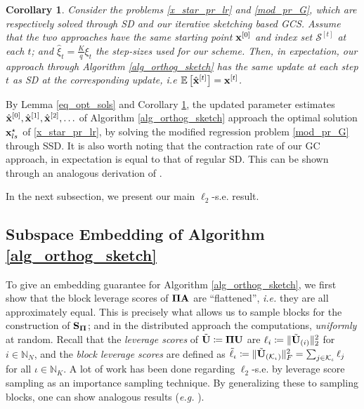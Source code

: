 \documentclass[journal,letterpaper,onecolumn,twoside,nofonttune]{IEEEtran}
\newcommand{\K}{\mathcal{K}}
\newcommand{\Ub}{\bold{U}}
\newcommand{\xb}{\bold{x}}
\newcommand{\xbh}{{\hat{\bold{x}}}}
\newcommand{\xih}{\hat{\xi}}
\newcommand{\Pibold}{\bold{\Pi}}
\newcommand{\Scal}{\mathcal{S}}
\newcommand{\E}{\mathbb{E}}
\newcommand{\N}{\mathbb{N}}
\newcommand{\Sb}{\bold{S}}
\newcommand{\SbPi}{\Sb_{\Pibold}}
\newcommand{\Ab}{\bold{A}}
\newcommand{\Ubt}{\tilde{\bold{U}}}
\newtheorem{Cor}{Corollary}
\begin{document}
\begin{Cor}
\label{eq_SSD_dor}  %
Consider the problems \eqref{x_star_pr_lr} and \eqref{mod_pr_G}, which are respectively solved through SD and our iterative sketching based GCS. Assume that the two approaches have the same starting point $\xb^{[0]}$ and index set $\Scal^{[t]}$ at each $t$; and $\xih_t=\frac{K}{q}\xi_t$ the step-sizes used for our scheme. Then, in expectation, our approach through Algorithm \ref{alg_orthog_sketch} has the same update at each step $t$ as SD at the corresponding update, i.e $\E\left[\xbh^{[t]}\right]=\xb^{[t]}$.
\end{Cor}

By Lemma \ref{eq_opt_sols} and Corollary \ref{eq_SSD_dor}, the updated parameter estimates $\xbh^{[0]},\xbh^{[1]},\xbh^{[2]},\ldots$ of Algorithm \ref{alg_orthog_sketch} approach the optimal solution $\xb_{ls}^{\star}$ of \eqref{x_star_pr_lr}, by solving the modified regression problem \eqref{mod_pr_G} through SSD. It is also worth noting that the contraction rate of our GC approach, in expectation is equal to that of regular SD. This can be shown through an analogous derivation of \cite[Theorem 6]{CPH23b}.%

In the next subsection, we present our main $\ell_2$-s.e. result.

\subsection{Subspace Embedding of Algorithm \ref{alg_orthog_sketch}}
\label{subsp_emb_alg1}

To give an embedding guarantee for Algorithm \ref{alg_orthog_sketch}, we first show that the block leverage scores of $\Pibold\Ab$ are ``flattened'', \textit{i.e.} they are all approximately equal. This is precisely what allows us to sample blocks for the construction of $\SbPi$; and in the distributed approach the computations, \textit{uniformly} at random. Recall that the \textit{leverage scores} of $\Ubt\coloneqq\Pibold\Ub$ are $\ell_i\coloneqq\|\Ubt_{(i)}\|_2^2$ for $i\in\N_N$, and the \textit{block leverage scores} \cite{OJXE18,CPH20a} are defined as $\tilde{\ell}_\iota\coloneqq\|\Ubt_{(\K_\iota)}\|_F^2=\sum_{j\in\K_\iota}\ell_j$ for all $\iota\in\N_K$. A lot of work has been done regarding $\ell_2$-s.e. by leverage score sampling \cite{DMM06,DMMS11,DMMW12,DM16,Woo14} as an importance sampling technique. By generalizing these to sampling blocks, one can show analogous results (\textit{e.g.} \cite{CPH20a,CPH23b}).
\end{document}
